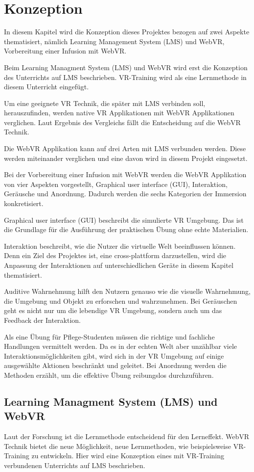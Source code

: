 \chapter{Konzeption}

In diesem Kapitel wird die Konzeption dieses Projektes bezogen auf zwei Aspekte thematisiert, nämlich Learning Management System (LMS) und WebVR, Vorbereitung einer Infusion mit WebVR.

Beim Learning Managment System (LMS) und WebVR wird erst die Konzeption des Unterrichts auf LMS beschrieben. VR-Training wird als eine Lernmethode in diesem Unterricht eingefügt.

Um eine geeignete VR Technik, die später mit LMS verbinden soll, herauszufinden, werden native VR Applikationen mit WebVR Applikationen verglichen. Laut Ergebnis des Vergleichs fällt die Entscheidung auf die WebVR Technik.

Die WebVR Applikation kann auf drei Arten mit LMS verbunden werden. Diese werden miteinander verglichen und eine davon wird in diesem Projekt eingesetzt.

Bei der Vorbereitung einer Infusion mit WebVR werden die WebVR Applikation von vier Aspekten vorgestellt, Graphical user interface (GUI), Interaktion, Geräusche und Anordnung. Dadurch werden die sechs Kategorien der Immersion \citep{28} konkretisiert.

Graphical user interface (GUI) beschreibt die simulierte VR Umgebung. Das ist die Grundlage für die Ausführung der praktischen Übung ohne echte Materialien.

Interaktion beschreibt, wie die Nutzer die virtuelle Welt beeinflussen können. Denn ein Ziel des Projektes ist, eine cross-plattform darzustellen, wird die Anpassung der Interaktionen auf unterschiedlichen Geräte in diesem Kapitel thematisiert.

Auditive Wahrnehmung hilft den Nutzern genauso wie die visuelle Wahrnehmung, die Umgebung und Objekt zu erforschen und wahrzunehmen. Bei Geräuschen geht es nicht nur um die lebendige VR Umgebung, sondern auch um das Feedback der Interaktion.

Als eine Übung für Pflege-Studenten müssen die richtige und fachliche Handlungen vermittelt werden. Da es in der echten Welt aber unzählbar viele Interaktionsmöglichkeiten gibt, wird sich in der VR Umgebung auf einige ausgewählte Aktionen beschränkt und geleitet. Bei Anordnung werden die Methoden erzählt, um die effektive Übung reibungslos durchzuführen. 

\section{Learning Managment System (LMS) und WebVR}
Laut der Forschung ist die Lernmethode entscheidend für den Lerneffekt. WebVR Technik bietet die neue Möglichkeit, neue Lernmethoden, wie beispielsweise VR-Training zu entwickeln. Hier wird eine Konzeption eines mit VR-Training verbundenen Unterrichts auf LMS beschrieben.


